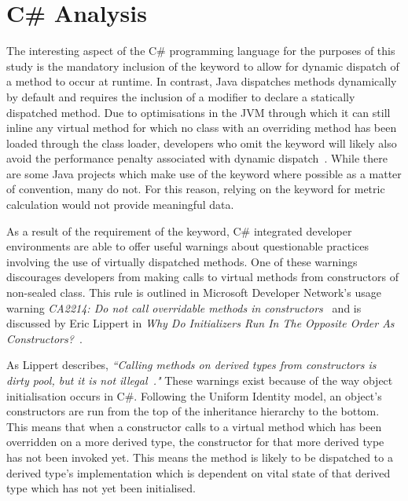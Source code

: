 \section{C\# Analysis}
\label{CSharpLit}
The interesting aspect of the C\# programming language for the purposes of this study is the mandatory inclusion of the  keyword to allow for dynamic dispatch of a method to occur at runtime. In contrast, Java dispatches methods dynamically by default and requires the inclusion of a  modifier to declare a statically dispatched method. Due to optimisations in the JVM through which it can still inline any virtual method for which no class with an overriding method has been loaded through the class loader, developers who omit the  keyword will likely also avoid the performance penalty associated with dynamic dispatch~\cite{JavaInlining}. While there are some Java projects which make use of the  keyword where possible as a matter of convention, many do not. For this reason, relying on the keyword for metric calculation would not provide meaningful data.
\newline

As a result of the requirement of the  keyword, C\# integrated developer environments are able to offer useful warnings about questionable practices involving the use of virtually dispatched methods. One of these warnings discourages developers from making calls to virtual methods from constructors of non-sealed class. This rule is outlined in Microsoft Developer Network's usage warning \textit{CA2214: Do not call overridable methods in constructors~\cite{OverridableMethodWarning}} and is discussed by Eric Lippert in \textit{Why Do Initializers Run In The Opposite Order As Constructors?~\cite{NoDowncalls}}.
\newline

As Lippert describes, \textit{``Calling methods on derived types from constructors is dirty pool, but it is not illegal~\cite{NoDowncalls}."} These warnings exist because of the way object initialisation occurs in C\#. Following the Uniform Identity model, an object's constructors are run from the top of the inheritance hierarchy to the bottom. This means that when a constructor calls to a virtual method which has been overridden on a more derived type, the constructor for that more derived type has not been invoked yet. This means the method is likely to be dispatched to a derived type's implementation which is dependent on vital state of that derived type which has not yet been initialised.

